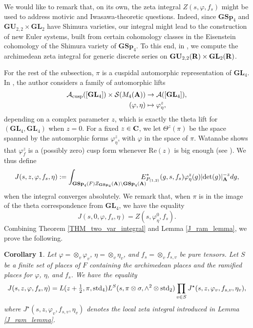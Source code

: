 \documentclass[11pt, reqno]{amsart}
\theoremstyle{plain}
\theoremstyle{definition}
\theoremstyle{remark}
\theoremstyle{plain}
\newtheorem{cord}[thma]{Corollary}
\def\C{{\bf C}}
\def\R{{\bf R}}
\def\A{{\bf A}}
\def\GSp{{\mathbf{GSp}}}
\def\GU{{\mathbf{GU}}}
\def\GL{\mathbf{GL}}
\begin{document}
We would like to remark that, on its own, the zeta integral $Z(s,\varphi,f_s)$ might be used to address motivic and Iwasawa-theoretic questions. Indeed, since $\GSp_4$ and $\GU_{2,2} \times \GL_2$ have Shimura varieties, our integral might lead to the construction of new Euler systems, built from certain cohomology classes in the Eisenstein cohomology of the Shimura variety of $\GSp_4$.  To this end, in \cite{CauchiGutiArchGU}, we compute the archimedean zeta integral for generic discrete series on $\GU_{2,2}(\R) \times \GL_2(\R)$.


For the rest of the subsection, $\pi$ is a cuspidal automorphic representation of $\GL_4$. In \cite{Watanabe:Global:Theta}, the author considers a family of automorphic lifts \begin{align*} \mathcal{A}_{\rm cusp}([\GL_4])\times \mathcal{S}(M_{4}(\A))&\to \mathcal{A}([\GL_4]),\\(\varphi, \eta)&\mapsto \varphi^{z}_{\eta},\end{align*} depending on a complex parameter $z$, which is exactly the theta lift for $(\GL_4,\GL_4)$ when $z=0$. For a fixed $z \in \C$, we let $\Theta^z(\pi)$ be the space spanned by the automorphic forms $\varphi^{z}_{\eta}$, with $\varphi$ in the space of $\pi$. Watanabe shows that  $\varphi^z_f$ is a (possibly zero) cusp form whenever $\mathrm{Re}(z)$ is big enough (see \cite[p. 707]{Watanabe:Global:Theta}). We thus define
\[J(s,z,\varphi,f_s, \eta) := \int_{{\GSp_4}(F) Z_{\GSp_4}(\A)\setminus {\GSp_4}(\A)} \!\!\!\!\!\! E^*_{P_{(1,2)}}(g,s, f_s)\varphi_\eta^z(g)| {\rm det}(g)|_\A^{-z} dg,\]
when the integral converges absolutely. We remark that, when $\pi$ is in the image of the theta correspondence from $\GL_4$, we have the equality $$J(s,0,\varphi,f_s, \eta) = Z(s,\varphi^0_\eta,f_s).$$ Combining Theorem \ref{THM_two_var_integral} and Lemma \ref{J_ram_lemma}, we prove the following.

\begin{cord}\label{Cord} Let $\varphi = \otimes_v\varphi_v$, $\eta= \otimes_v \eta_v$, and $f_{s} = \otimes_v f_{s,v}$ be pure tensors. Let $S$ be a finite set of places of $F$ containing the archimedean places and the ramified places for $\varphi$, $\eta$, and $f_s$. We have the equality 
    $$J(s,z,\varphi,f_s, \eta) = L(z+ \tfrac{1}{2},\pi,{\rm std}_4) L^S(s,\pi \otimes \sigma,\wedge^2 \otimes \mathrm{std}_2) \prod_{v \in S} J^\star(s,z,\varphi_v,f_{s,v},\eta_v),$$where $J^\star(s,z,\varphi_v,f_{s,v},\eta_v)$ denotes the local zeta integral introduced in Lemma \ref{J_ram_lemma}.
\end{cord}
\end{document}
